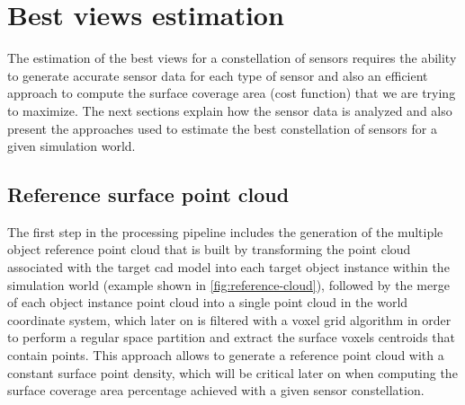 \section{Best views estimation}\label{sec:best-views-estimation}

The estimation of the best views for a constellation of sensors requires the ability to generate accurate sensor data for each type of sensor and also an efficient approach to compute the surface coverage area (cost function) that we are trying to maximize. The next sections explain how the sensor data is analyzed and also present the approaches used to estimate the best constellation of sensors for a given simulation world.

\subsection{Reference surface point cloud}

The first step in the processing pipeline includes the generation of the multiple object reference point cloud that is built by transforming the point cloud associated with the target \gls{cad} model into each target object instance within the simulation world (example shown in \cref{fig:reference-cloud}), followed by the merge of each object instance point cloud into a single point cloud in the world coordinate system, which later on is filtered with a voxel grid algorithm in order to perform a regular space partition and extract the surface voxels centroids that contain points. This approach allows to generate a reference point cloud with a constant surface point density, which will be critical later on when computing the surface coverage area percentage achieved with a given sensor constellation.


